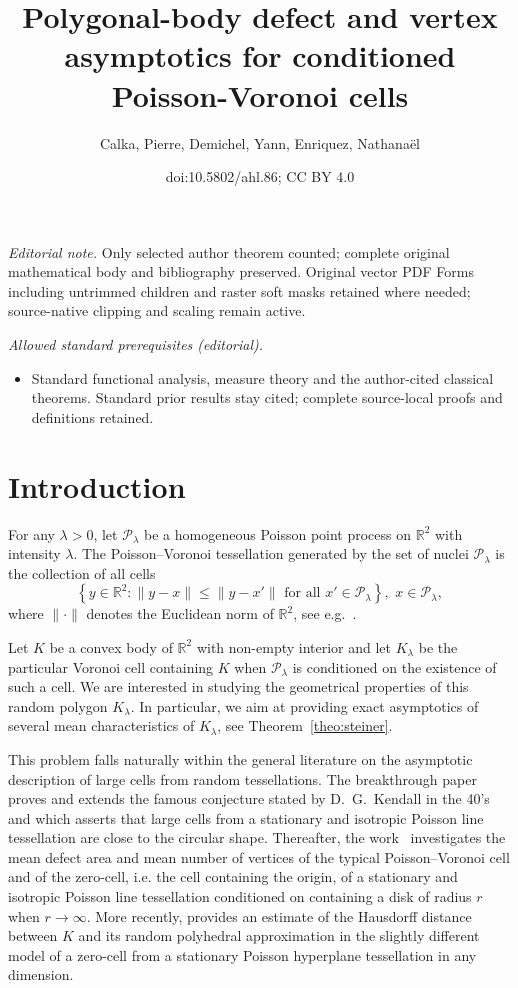 \documentclass[10pt]{amsart}
\title{Polygonal-body defect and vertex asymptotics for conditioned Poisson-Voronoi cells}
\author{Calka, Pierre, Demichel, Yann, Enriquez, Nathanaël}
\date{doi:10.5802/ahl.86; CC BY 4.0}
\theoremstyle{definition}\newtheorem{defi}[theo]{Definition}\newtheorem{rema}[theo]{Remark}\newtheorem{exam}[theo]{Example}\newtheorem{exem}[theo]{Example}\newtheorem{nota}[theo]{Notation}
\newcommand{\cP}{\mathcal{P}}
\newcommand{\R}{\mathbb{R}}
\newcommand{\pass}{\vspace{0.3cm}\noindent}
\newcommand{\noi}{\noindent}
\begin{document}
\maketitle
\noindent\textit{Editorial note.} Only selected author theorem counted; complete original mathematical body and bibliography preserved. Original vector PDF Forms including untrimmed children and raster soft masks retained where needed; source-native clipping and scaling remain active.\par\medskip
\noindent\textit{Allowed standard prerequisites (editorial).}\begin{itemize}
\item Standard functional analysis, measure theory and the author-cited classical theorems. Standard prior results stay cited; complete source-local proofs and definitions retained.
\end{itemize}\medskip


\section{Introduction}\label{sec:intro}

For any $\lambda>0$, let $\cP_{\lambda}$ be a homogeneous Poisson point process on $\R^2$ with intensity $\lambda$. The Poisson--Voronoi tessellation generated by the set of nuclei $\cP_\lambda$ is the collection of all cells
\[
\left\{y\in\R^2:\|y-x\|\le \|y-x'\| \text{ for all } x'\in \cP_\lambda\right\}, \,\, x\in \cP_\lambda,
\]
where $\|\cdot\|$ denotes the Euclidean norm of $\R^2$, see e.g.~\cite{mol94,okabe}.

Let $K$ be a convex body of $\R^2$ with non-empty interior and let $K_{\lambda}$ be the particular Voronoi cell containing $K$ when $\cP_\lambda$ is conditioned on the existence of such a cell. We are interested in studying the geometrical properties of this random polygon $K_{\lambda}$. In particular, we aim at providing exact asymptotics of several mean characteristics of $K_{\lambda}$, see Theorem~\ref{theo:steiner}.

This problem falls naturally within the general literature on the asymptotic description of large cells from random tessellations. The breakthrough paper~\cite{hrs04} proves and extends the famous conjecture stated by D.~G.~Kendall in the 40's and which asserts that large cells from a stationary and isotropic Poisson line tessellation are close to the circular shape. Thereafter, the work~\cite{cs05} investigates the mean defect area and mean number of vertices of the typical Poisson--Voronoi cell and of the zero-cell, i.e. the cell containing the origin, of a stationary and isotropic Poisson line tessellation conditioned on containing a disk of radius $r$ when $r\to\infty$. More recently, \cite{hs14} provides an estimate of the Hausdorff distance between $K$ and its random polyhedral approximation in the slightly different model of a zero-cell from a stationary Poisson hyperplane tessellation in any dimension.
\end{document}
